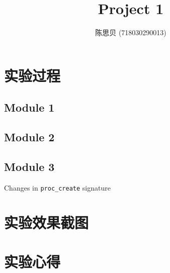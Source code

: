 \documentclass[UTF8]{ctexrep}
\title{
    \horrule{0.5pt} \\[0.4cm]
    \huge Project 1 \\
    \horrule{2pt}
}
\author{
    陈思贝 (718030290013)
}
\date{
}
\begin{document}
    \maketitle
    \section{实验过程}
    \subsection{Module 1}
    \subsection{Module 2}
    \subsection{Module 3}
    Changes in \texttt{proc\_create} signature
    \section{实验效果截图}
    \section{实验心得}
\end{document}
